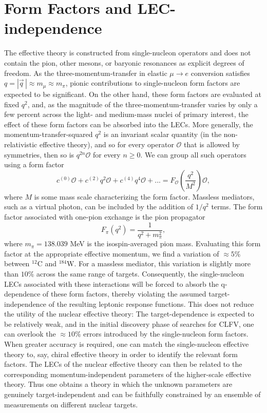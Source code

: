 \documentclass{book}[letterpaper,12pt]
\begin{document}
\section{Form Factors and LEC-independence}
\label{sec:form_factors}
The effective theory is constructed from single-nucleon operators and does not contain the pion, other mesons, or baryonic resonances as explicit degrees of freedom. As the three-momentum-transfer in elastic $\mu\rightarrow e$ conversion satisfies $q=|\vec{q}\,|\approx m_{\mu}\approx m_{\pi}$, pionic contributions to single-nucleon form factors are expected to be significant. On the other hand, these form factors are evaluated at fixed $q^2$, and, as the magnitude of the three-momentum-transfer varies by only a few percent across the light- and medium-mass nuclei of primary interest, the effect of these form factors can be absorbed into the LECs. More generally, the momentum-transfer-squared $q^2$ is an invariant scalar quantity (in the non-relativistic effective theory), and so for every operator $\mathcal{O}$ that is allowed by symmetries, then so is $q^{2n}\mathcal{O}$ for every $n\geq 0$. We can group all such operators using a form factor
\begin{equation}
c^{(0)}\mathcal{O}+c^{(2)} q^2\mathcal{O}+c^{(4)}q^4\mathcal{O}+...=F_{\mathcal{O}}\left(\frac{q^2}{M^2}\right)\mathcal{O},
\end{equation}
where $M$ is some mass scale characterizing the form factor. Massless mediators, such as a virtual photon, can be included by the addition of $1/q^2$ terms. The form factor associated with one-pion exchange is the pion propagator
\begin{equation}
F_{\pi}(q^2)=\frac{1}{q^2+m_{\pi}^2},
\end{equation}
where $m_{\pi}=138.039$ MeV is the isospin-averaged pion mass. Evaluating this form factor at the appropriate effective momentum, we find a variation of $\approx 5\%$ between $^{12}$C and $^{184}$W. For a massless mediator, this variation is slightly more than $10\%$ across the same range of targets. Consequently, the single-nucleon LECs associated with these interactions will be forced to absorb the q-dependence of these form factors, thereby violating the assumed target-independence of the resulting leptonic response functions. This does not reduce the utility of the nuclear effective theory: The target-dependence is expected to be relatively weak, and in the initial discovery phase of searches for CLFV, one can overlook the $\approx 10 \%$ errors introduced by the single-nucleon form factors. When greater accuracy is required, one can match the single-nucleon effective theory to, say, chiral effective theory in order to identify the relevant form factors. The LECs of the nuclear effective theory can then be related to the corresponding momentum-independent parameters of the higher-scale effective theory. Thus one obtains a theory in which the unknown parameters are genuinely target-independent and can be faithfully constrained by an ensemble of measurements on different nuclear targets. 
\end{document}

